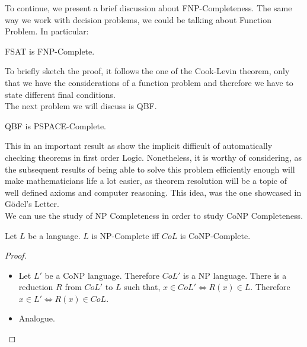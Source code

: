 


To continue,  we  present a brief discussion about FNP-Completeness. The same way we work with decision problems, we could be talking about Function Problem. In particular:


\begin{theorem} FSAT is FNP-Complete.  
\end{theorem}
To briefly sketch the proof, it  follows the one of the Cook-Levin theorem, only that we have the considerations of a function problem and therefore we have to state different final conditions.\\

The next problem we will discuss is QBF.

\begin{theorem} QBF is PSPACE-Complete.
\end{theorem}

This in an important result as show the implicit difficult of automatically checking theorems in first order Logic. Nonetheless, it is worthy of considering, as the subsequent results of being able to solve this problem efficiently enough will make mathematicians life a lot easier, as theorem resolution will be a topic of well defined axioms and computer reasoning. This idea, was the one showcased in Gödel's Letter. \\


We can use the study of NP Completeness in order to study CoNP Completeness.

\begin{proposition}
  Let $L$ be a language. $L$ is NP-Complete iff $CoL$ is CoNP-Complete.
\end{proposition}

\begin{proof}  \hfill
  \begin{itemize}
  \item[\fbox{$\Rightarrow$}] 
    Let $L'$ be a CoNP language. Therefore $CoL'$ is a NP language. There is a reduction $R$ from $CoL'$ to $L$ such that, $x \in CoL' \iff R(x) \in L$. Therefore $x \in L' \iff R(x) \in CoL$.
  \item[\fbox{$\Leftarrow$}] Analogue.
  \end{itemize}
\end{proof}

